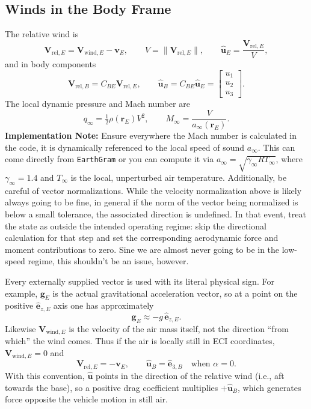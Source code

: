 \subsection{Winds in the Body Frame}
The relative wind is
\begin{equation}
\mathbf V_{\mathrm{rel},E} = \mathbf V_{\mathrm{wind},E} - \mathbf v_E,
\qquad
V = \|\mathbf V_{\mathrm{rel},E}\|,
\qquad
\hat{\mathbf u}_E = \frac{\mathbf V_{\mathrm{rel},E}}{V}, \label{eq:relative_wind_eci}
\end{equation}
and in body components
\begin{equation}
\mathbf V_{\mathrm{rel},B}=C_{BE}\mathbf V_{\mathrm{rel},E},
\qquad
\hat{\mathbf u}_B=C_{BE}\hat{\mathbf u}_E=
\begin{bmatrix}
u_1\\u_2\\u_3
\end{bmatrix}. \label{eq:relative_wind_body}
\end{equation}
The local dynamic pressure and Mach number are
\begin{equation}
q_\infty=\tfrac12 \rho(\mathbf r_E)V^2,
\qquad
M_\infty=\frac{V}{a_\infty(\mathbf r_E)}. \label{eq:mach_def}
\end{equation}
\textbf{Implementation Note:} Ensure everywhere the Mach number is calculated in the code, it is dynamically referenced to the local speed of sound \(a_\infty\). This can come directly from \texttt{EarthGram} or you can compute it via \(a_\infty = \sqrt{\gamma_\infty R T_\infty}\), where \(\gamma_\infty = 1.4\) and \(T_\infty\) is the local, unperturbed air temperature. Additionally, be careful of vector normalizations. While the velocity normalization above is likely always going to be fine, in general if the norm of the vector being normalized is below a small tolerance, the associated direction is undefined. In that event, treat the state as outside the intended operating regime: skip the directional calculation for that step and set the corresponding aerodynamic force and moment contributions to zero. Sine we are almost never going to be in the low-speed regime, this shouldn't be an issue, however.

Every externally supplied vector is used with its literal physical sign. For example, \(\mathbf g_E\) is the actual gravitational acceleration vector, so at a point on the positive \(\hat{\mathbf e}_{z,E}\) axis one has approximately
\[
\mathbf g_E\approx -g\,\hat{\mathbf e}_{z,E}.
\]
Likewise \(\mathbf V_{\mathrm{wind},E}\) is the velocity of the air mass itself, not the direction ``from which'' the wind comes. Thus if the air is locally still in ECI coordinates, \(\mathbf V_{\mathrm{wind},E}=0\) and
\[
\mathbf V_{\mathrm{rel},E}=-\mathbf v_E,
\qquad
\hat{\mathbf u}_B=\hat{\mathbf e}_{3,B}
\quad\text{when }\alpha=0.
\]
With this convention, \(\hat{\mathbf u}\) points in the direction of the relative wind (i.e., aft towards the base), so a positive drag coefficient multiplies \(+\hat{\mathbf u}_B\), which generates force opposite the vehicle motion in still air.

